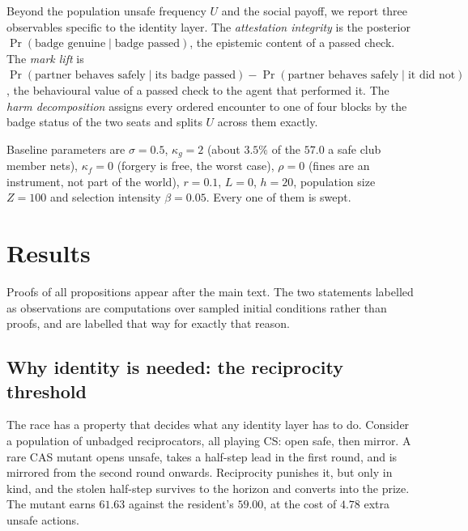 \documentclass[11pt,a4paper]{article}
\theoremstyle{definition}
\newcommand{\CS}{\textsf{CS}}
\newcommand{\CAS}{\textsf{CAS}}
\begin{document}
Beyond the population unsafe frequency $U$ and the social payoff, we report
three observables specific to the identity layer. The \emph{attestation
integrity} is the posterior $\Pr(\text{badge genuine} \mid \text{badge
passed})$, the epistemic content of a passed check. The \emph{mark lift} is
$\Pr(\text{partner behaves safely} \mid \text{its badge passed}) -
\Pr(\text{partner behaves safely} \mid \text{it did not})$, the behavioural
value of a passed check to the agent that performed it. The \emph{harm
decomposition} assigns every ordered encounter to one of four blocks by the
badge status of the two seats and splits $U$ across them exactly.

Baseline parameters are $\sigma = 0.5$, $\kappa_g = 2$ (about $3.5\%$ of the
$57.0$ a safe club member nets), $\kappa_f = 0$ (forgery is free, the worst
case), $\rho = 0$ (fines are an instrument, not part of the world), $r = 0.1$,
$L = 0$, $h = 20$, population size $Z = 100$ and selection intensity
$\beta = 0.05$. Every one of them is swept.



\section{Results}
\label{sec:results}

Proofs of all propositions appear after the main text. The two
statements labelled as observations are computations over sampled initial
conditions rather than proofs, and are labelled that way for exactly that
reason.

\subsection{Why identity is needed: the reciprocity threshold}
\label{sec:reciprocity}

The race has a property that decides what any identity layer has to do. Consider
a population of unbadged reciprocators, all playing \CS{}: open safe, then
mirror. A rare \CAS{} mutant opens unsafe, takes a half-step lead in the first
round, and is mirrored from the second round onwards. Reciprocity punishes it,
but only in kind, and the stolen half-step survives to the horizon and converts
into the prize. The mutant earns $61.63$ against the resident's $59.00$, at the
cost of $4.78$ extra unsafe actions.
\end{document}
